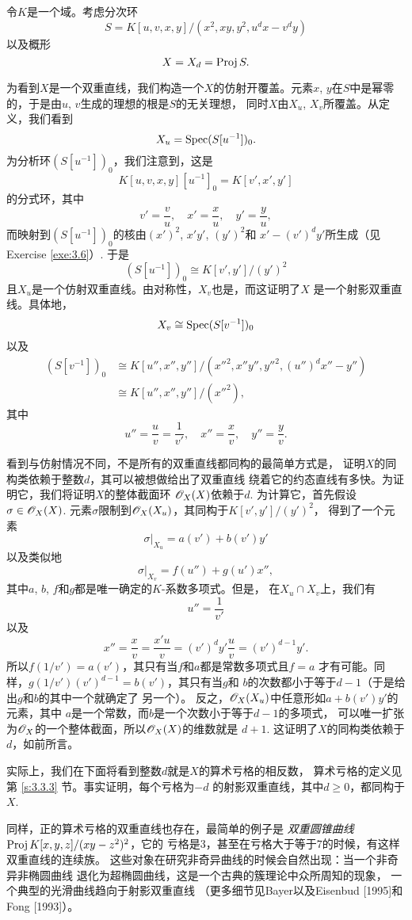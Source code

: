 令$K$是一个域。考虑分次环
\[
	S=K[u,v,x,y]/(x^2,xy,y^2,u^dx-v^dy)
\]
以及概形
\[
	X=X_d=\operatorname{Proj} S.
\]

为看到$X$是一个双重直线，我们构造一个$X$的仿射开覆盖。元素$x$,
$y$在$S$中是幂零的，于是由$u$, $v$生成的理想的根是$S$的无关理想，
同时$X$由$X_u$, $X_v$所覆盖。从定义，我们看到
\[
	X_u=\operatorname{Spec} (S[u^{-1}])_0.
\]%
为分析环$(S[u^{-1}])_0$，我们注意到，这是
\[
	K[u,v,x,y][u^{-1}]_0=K[v',x',y']
\]
的分式环，其中
\[
	v'=\frac vu,\quad x'=\frac xu,\quad y'=\frac yu,
\]
而映射到$(S[u^{-1}])_0$的核由$(x')^2$, $x'y'$, $(y')^2$和
$x'-(v')^dy'$所生成（见Exercise \ref{exe:3.6}）. 于是
\[
	(S[u^{-1}])_0\cong K[v',y']/(y')^2
\]
且$X_u$是一个仿射双重直线。由对称性，$X_v$也是，而这证明了$X$
是一个射影双重直线。具体地，
\[
	X_v\cong \operatorname{Spec} (S[v^{-1}])_0
\]
以及
\begin{align*}
(S[v^{-1}])_0{}&\cong K[u'',x'',y'']/({x''}^2,x''y'',{y''}^2,
(u'')^dx''-y'')\\
{}&\cong K[u'',x'',y'']/({x''}^2),
\end{align*}
其中
\[
	u''=\frac uv=\frac 1{v'},\quad x''=\frac xv,\quad 
	y''=\frac yv.
\]

看到与仿射情况不同，不是所有的双重直线都同构的最简单方式是，
证明$X$的同构类依赖于整数$d$，其可以被想做给出了双重直线
绕着它的约态直线有多快。为证明它，我们将证明$X$的整体截面环
$\mathscr{O}_X(X)$依赖于$d$. 为计算它，首先假设$\sigma\in \mathscr{O}_X(X)$.
元素$\sigma$限制到$\mathscr{O}_X(X_u)$，其同构于$K[v',y']/(y')^2$，
得到了一个元素
\[
	\sigma|_{X_u}=a(v')+b(v')y'
\]
以及类似地
\[
	\sigma|_{X_v}=f(u'')+g(u')x'',
\]
其中$a$, $b$, $f$和$g$都是唯一确定的$K$-系数多项式。但是，
在$X_u\cap X_v$上，我们有
\[
	u''=\frac 1{v'}
\]
以及
\[
	x''=\frac xv=\frac{x'u}v=(v')^d y'\frac uv=(v')^{d-1}y'.
\]
所以$f(1/v')=a(v')$，其只有当$f$和$a$都是常数多项式且$f=a$
才有可能。同样，$g(1/v')(v')^{d-1}=b(v')$，其只有当$g$和
$b$的次数都小于等于$d-1$（于是给出$g$和$b$的其中一个就确定了
另一个）。%
反之，$\mathscr{O}_X(X_u)$中任意形如$a+b(v')y'$的元素，其中
$a$是一个常数，而$b$是一个次数小于等于$d-1$的多项式，
可以唯一扩张为$\mathscr{O}_X$的一个整体截面，所以$\mathscr{O}_X(X)$的维数就是
$d+1$. 这证明了$X$的同构类依赖于$d$，如前所言。

实际上，我们在下面将看到整数$d$就是$X$的算术亏格的相反数，
算术亏格的定义见第 \ref{s:3.3.3} 节。事实证明，每个亏格为$-d$
的射影双重直线，其中$d\geq 0$，都同构于$X$.

同样，正的算术亏格的双重直线也存在，最简单的例子是
\textit{双重圆锥曲线} $\operatorname{Proj} K[x,y,z]/(xy-z^2)^2$，它的
亏格是$3$，甚至在亏格大于等于$7$的时候，有这样双重直线的连续族。
这些对象在研究非奇异曲线的时候会自然出现：当一个非奇异非椭圆曲线
退化为超椭圆曲线，这是一个古典的簇理论中众所周知的现象，
一个典型的光滑曲线趋向于射影双重直线 \nottran 
（更多细节见Bayer以及Eisenbud [1995]和Fong [1993]）。

